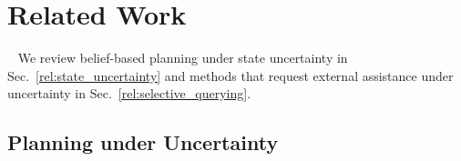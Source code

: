 % 

\section{Related Work}~\label{related}
We review belief-based planning under state uncertainty in Sec.~\ref{rel:state_uncertainty} and methods that request external assistance under uncertainty in Sec.~\ref{rel:selective_querying}.

\subsection{Planning under Uncertainty}~\label{rel:state_uncertainty}

